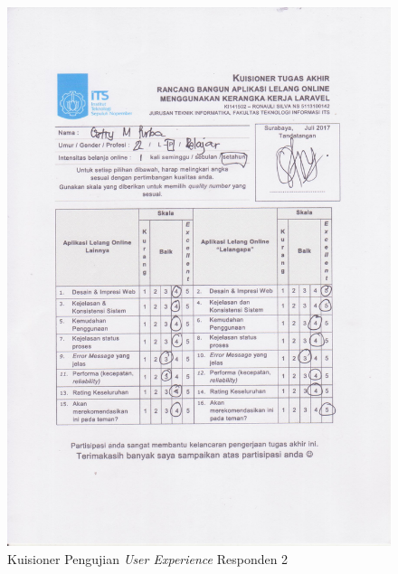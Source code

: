 \begin{figure}[H]
	\centering
	\includegraphics[width=.9\textwidth]{images/bab5/ujipengguna/2.jpg}
	\caption{Kuisioner Pengujian \textit{User Experience} Responden 2}
	\label{quest-2}
\end{figure}
